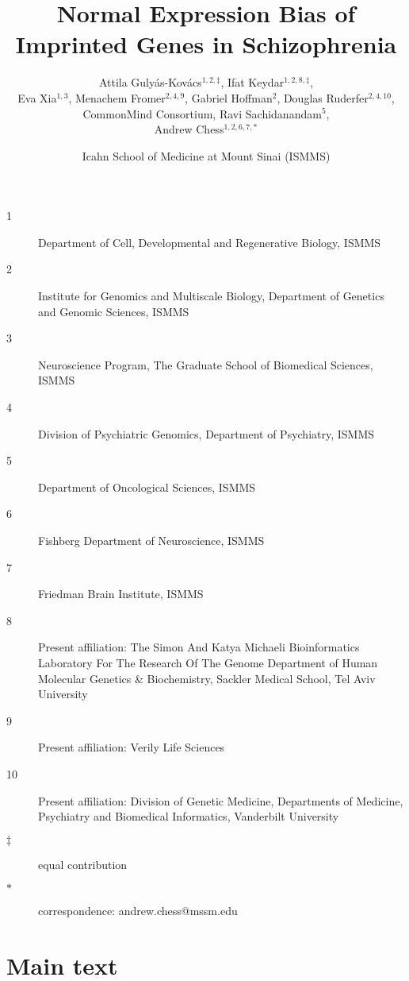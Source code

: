 \documentclass[letterpaper]{article}
\title{Normal Expression Bias of Imprinted Genes in Schizophrenia}
\author{Attila Guly\'{a}s-Kov\'{a}cs\(^{1,2,\ddagger}\), Ifat Keydar\(^{1,2,8,\ddagger}\), \\
Eva Xia\(^{1,3}\), Menachem Fromer\(^{2,4,9}\), Gabriel Hoffman\(^{2}\), Douglas
Ruderfer\(^{2,4,10}\), \\
CommonMind Consortium, Ravi Sachidanandam\(^{5}\), \\
Andrew Chess\(^{1,2,6,7,\ast}\)}
\date{Icahn School of Medicine at Mount Sinai (ISMMS)}
\begin{document}
\maketitle

\begin{description}
\item[1] Department of Cell, Developmental and Regenerative Biology, ISMMS 
\item[2] Institute for Genomics and Multiscale Biology, Department of Genetics and Genomic Sciences, ISMMS 
\item[3] Neuroscience Program, The Graduate School of Biomedical Sciences, ISMMS 
\item[4] Division of Psychiatric Genomics, Department of Psychiatry, ISMMS 
\item[5] Department of Oncological Sciences, ISMMS 
\item[6] Fishberg Department of Neuroscience, ISMMS 
\item[7] Friedman Brain Institute, ISMMS 
\item[8] Present affiliation: The Simon And Katya Michaeli Bioinformatics
Laboratory For The Research Of The Genome Department of Human Molecular
Genetics \& Biochemistry, Sackler Medical School, Tel Aviv University
\item[9] Present affiliation: Verily Life Sciences
\item[10] Present affiliation: Division of Genetic Medicine, Departments of
Medicine, Psychiatry and Biomedical Informatics, Vanderbilt University
\item[\(\ddagger\)] equal contribution 
\item[\(\ast\)] correspondence: andrew.chess@mssm.edu 
\end{description}

\clearpage
\tableofcontents

\clearpage

\section{Main text}
\end{document}
